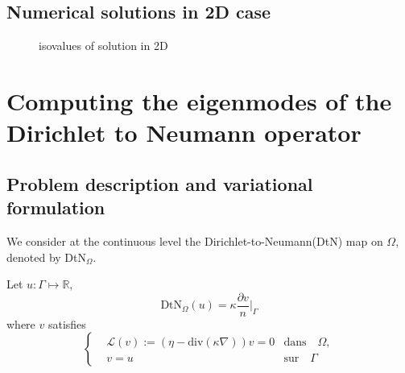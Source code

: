\subsection{Numerical solutions in 2D case}
\label{sec:numerical-solutions}
\begin{figure}[htbp]
  \centering
  \caption{isovalues of solution in 2D}
  \label{fig:original}
\end{figure}


\section{Computing the eigenmodes of the Dirichlet to Neumann operator}
\label{sec:comp-eigenm-dirichl}

\subsection{Problem description and variational formulation}
\label{sec:probl-descr-vari}

We consider at the continuous level the Dirichlet-to-Neumann(DtN) map on $\Omega$, denoted by DtN$_{\Omega}$.

Let $u: \Gamma \longmapsto \mathbb R, $
\begin{equation*}
  \label{eq:35}
\text{DtN}_{\Omega}(u) = \kappa \frac{\partial v}{ n} \Big |_{\Gamma}
\end{equation*}
where $v$ satisfies
\begin{equation}
  \label{eq:36}
\left\{
  \begin{aligned}
    & \mathcal L(v):= (\eta - \text{div}(\kappa \nabla))v = 0 & \text{dans} \quad \Omega,\\
    & v = u & \text{sur} \quad \Gamma
  \end{aligned}
\right.
\end{equation}

